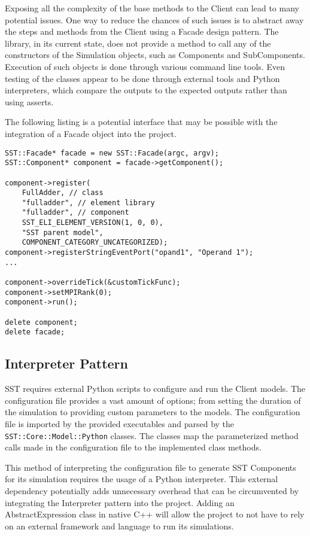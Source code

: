 Exposing all the complexity of the base methods to the Client can lead to many potential issues. One way to reduce the chances of such issues is to abstract away the steps and methods from the Client using a Facade design pattern. The library, in its current state, does not provide a method to call any of the constructors of the Simulation objects, such as Components and SubComponents. Execution of such objects is done through various command line tools. Even testing of the classes appear to be done through external tools and Python interpreters, which compare the outputs to the expected outputs rather than using asserts.

The following listing is a potential interface that may be possible with the integration of a Facade object into the project.

\begin{lstlisting}[style=customC++,label=facade,caption=Potential Implementation of Facade]
SST::Facade* facade = new SST::Facade(argc, argv);
SST::Component* component = facade->getComponent();

component->register(
    FullAdder, // class
    "fulladder", // element library
    "fulladder", // component
    SST_ELI_ELEMENT_VERSION(1, 0, 0),
    "SST parent model",
    COMPONENT_CATEGORY_UNCATEGORIZED);
component->registerStringEventPort("opand1", "Operand 1");
...

component->overrideTick(&customTickFunc);
component->setMPIRank(0);
component->run();

delete component;
delete facade;
\end{lstlisting}

\subsection{Interpreter Pattern}
SST requires external Python scripts to configure and run the Client models. The configuration file provides a vast amount of options; from setting the duration of the simulation to providing custom parameters to the models. The configuration file is imported by the provided executables and parsed by the \texttt{SST::Core::Model::Python} classes. The classes map the parameterized method calls made in the configuration file to the implemented class methods.

This method of interpreting the configuration file to generate SST Components for its simulation requires the usage of a Python interpreter. This external dependency potentially adds unnecessary overhead that can be circumvented by integrating the Interpreter pattern into the project. Adding an AbstractExpression class in native C++ will allow the project to not have to rely on an external framework and language to run its simulations.

